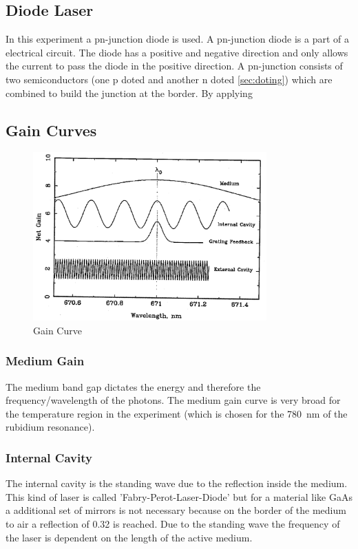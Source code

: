 \subsection{Diode Laser}
In this experiment a pn-junction diode is used.
A pn-junction diode is a part of a electrical circuit.
The diode has a positive and negative direction and only allows the current to pass the diode in the positive direction.
A pn-junction consists of two semiconductors (one p doted and another n doted \ref{sec:doting}) which are combined to build the junction at the border.
By applying
\cite{laser_diode}

\subsection{Gain Curves}
\begin{figure}
    \center
    \includegraphics[width=0.8\textwidth]{bilder/Gain_curve.png}
    \caption{Gain Curve \cite{anleitung}}
    \label{fig:gain}
\end{figure}
\subsubsection*{Medium Gain}
The medium band gap dictates the energy and therefore the frequency/wavelength of the photons.
The medium gain curve is very broad for the temperature region in the experiment (which is chosen for the \SI{780}{\nano \metre} of the rubidium resonance).
\subsubsection*{Internal Cavity}
The internal cavity is the standing wave due to the reflection inside the medium.
This kind of laser is called 'Fabry-Perot-Laser-Diode' but for a material like GaAs a additional set of mirrors is not necessary because on the border of the medium to air a reflection of \num{0.32} is reached.
Due to the standing wave the frequency of the laser is dependent on the length of the active medium. 
